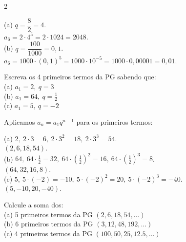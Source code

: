 \documentclass[11pt]{article}
\begin{document}
\begin{multicols}{2}
\begin{enumerate}[leftmargin=*]
\begin{tcolorbox}[colback=green!10,colframe=green!60!black,title=\textbf{Solução da questão 3 },text width=0.9\columnwidth]
(a) $q=\dfrac{8}{2}=4$. \\
$a_6 = 2\cdot 4^{5} = 2\cdot 1024 = \boxed{2048}.$ \\

(b) $q=\dfrac{100}{1000}=0{,}1$. \\
$a_6 = 1000\cdot (0{,}1)^{5} = 1000\cdot 10^{-5} = 1000\cdot 0{,}00001 = \boxed{0{,}01}.$
\end{tcolorbox}

\begin{tcolorbox}[colback=blue!8,colframe=blue!60!black,title=\textbf{Questão 4 },text width=0.9\columnwidth]
Escreva os 4 primeiros termos da PG sabendo que: \\
(a) $a_1=2,\ q=3$ \\ (b) $a_1=64,\ q=\tfrac{1}{2}$ \\  (c) $a_1=5,\ q=-2$
\end{tcolorbox}

\begin{tcolorbox}[colback=green!10,colframe=green!60!black,title=\textbf{Solução da questão 4 },text width=0.9\columnwidth]
Aplicamos $a_{n}=a_1 q^{n-1}$ para os primeiros termos:

(a) $2,\ 2\cdot3=6,\ 2\cdot3^2=18,\ 2\cdot3^3=54$. \\
\(\boxed{(2,6,18,54)}\).  \\

(b) $64,\ 64\cdot\tfrac12=32,\ 64\cdot(\tfrac12)^2=16,\ 64\cdot(\tfrac12)^3=8$. \\
\(\boxed{(64,32,16,8)}\). \\

(c) $5,\ 5\cdot(-2)=-10,\ 5\cdot(-2)^2=20,\ 5\cdot(-2)^3=-40$. \\
\(\boxed{(5,-10,20,-40)}\).
\end{tcolorbox}

\begin{tcolorbox}[colback=blue!8,colframe=blue!60!black,title=\textbf{Questão 5 },text width=0.9\columnwidth]
Calcule a soma dos: \\
(a) 5 primeiros termos da PG $(2,6,18,54,\ldots)$ \\
(b) 6 primeiros termos da PG $(3,12,48,192,\ldots)$ \\
(c) 4 primeiros termos da PG $(100,50,25,12.5,\ldots)$
\end{tcolorbox}


\end{enumerate}
\end{multicols}
\end{document}
